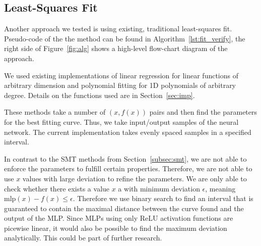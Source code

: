     \subsection{Least-Squares Fit}
        \label{subsec:sqa}
        \vspace{0.3cm}
        \begin{tcolorbox}[arc=0mm, colback=rwthlightgray, outer arc=0mm,colframe = white, size=small, bottom=-9mm]
            
        \end{tcolorbox}
        \vspace{9mm}
        Another approach we tested is using existing, traditional least-squares fit. Pseudo-code of the the method can be found in Algorithm~\ref{lst:fit_verify}, the right side of Figure~\ref{fig:alg} shows a high-level flow-chart diagram of the approach.\par
        We used existing implementations of linear regression for linear functions of arbitrary dimension and polynomial fitting for 1D polynomials of arbitrary degree. Details on the functions used are in Section~\ref{sec:imp}.\par
        These methods take a number of $(x,f(x))$ pairs and then find the parameters for the best fitting curve. Thus, we take input/output samples of the neural network. The current implementation takes evenly spaced samples in a specified interval.\par
        In contrast to the SMT methods from Section~\ref{subsec:smt}, we are not able to enforce the parameters to fulfill certain properties. Therefore, we are not able to use $x$ values with large deviation to refine the parameters. We are only able to check whether there exists a value $x$ a with minimum deviation $\epsilon$, meaning ${\text{mlp}(x)-f(x)\leq\epsilon}$. Therefore we use binary search to find an interval that is guaranteed to contain the maximal distance between the curve found and the output of the MLP. Since MLPs using only ReLU activation functions are picewise linear, it would also be possible to find the maximum deviation analytically. This could be part of further research.\par
